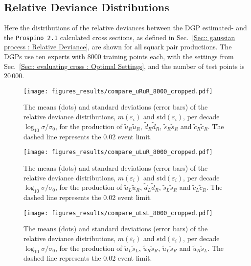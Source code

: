 \documentclass[twoside,english]{uiofysmaster}
\begin{document}
{{\begin{appendices}
\chapter{Relative Deviance Distributions}\label{App:: Relative Deviance Distributions}

Here the distributions of the relative deviances between the DGP estimated- and the \verb|Prospino 2.1| calculated cross sections, as defined in Sec.~\ref{Sec:: gaussian process : Relative Deviance}, are shown for all squark pair productions. The DGPs use ten experts with 8000 training points each, with the settings from Sec.~\ref{Sec:: evaluating cross : Optimal Settings}, and the number of test points is $20\,000$.

\begin{figure}[H]
\centering
\texttt{[image: figures\_results/compare\_uRuR\_8000\_cropped.pdf]}
\caption{The means (dots) and standard deviations (error bars) of the relative deviance distributions, $m(\varepsilon_i)$ and $\mathrm{std}(\varepsilon_i)$, per decade $\log_{10} \sigma / \sigma_0$, for the production of $\widetilde{u}_R \widetilde{u}_R$, $\widetilde{d}_R \widetilde{d}_R$, $\widetilde{s}_R \widetilde{s}_R$ and $\widetilde{c}_R \widetilde{c}_R$. The dashed line represents the 0.02 event limit.}
\end{figure}

\begin{figure}
\centering
\texttt{[image: figures\_results/compare\_uLuR\_8000\_cropped.pdf]}
\caption{The means (dots) and standard deviations (error bars) of the relative deviance distributions, $m(\varepsilon_i)$ and $\mathrm{std}(\varepsilon_i)$, per decade $\log_{10} \sigma / \sigma_0$, for the production of $\widetilde{u}_L \widetilde{u}_R$, $\widetilde{d}_L \widetilde{d}_R$, $\widetilde{s}_L \widetilde{s}_R$ and $\widetilde{c}_L \widetilde{c}_R$. The dashed line represents the 0.02 event limit.}
\end{figure}

\begin{figure}
\centering
\texttt{[image: figures\_results/compare\_uLsL\_8000\_cropped.pdf]}
\caption{The means (dots) and standard deviations (error bars) of the relative deviance distributions, $m(\varepsilon_i)$ and $\mathrm{std}(\varepsilon_i)$, per decade $\log_{10} \sigma / \sigma_0$, for the production of $\widetilde{u}_L \widetilde{s}_L$, $\widetilde{u}_R \widetilde{s}_R$, $\widetilde{u}_L \widetilde{s}_R$ and $\widetilde{u}_R \widetilde{s}_L$. The dashed line represents the 0.02 event limit.}
\end{figure}


\end{appendices}}}
\end{document}
